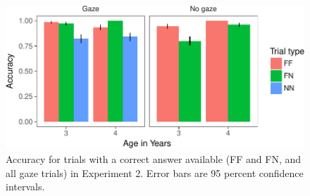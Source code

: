 \documentclass[a4paper,man,apacite,floatsintext]{apa6}
\newenvironment{CodeChunk}{}{}
\begin{document}
\begin{CodeChunk}
\begin{figure}[b]

{\centering \includegraphics{figs/acc_e2-1} 

}

\caption[Accuracy for trials with a correct answer available (FF and FN, and all gaze trials) in Experiment 2]{Accuracy for trials with a correct answer available (FF and FN, and all gaze trials) in Experiment 2. Error bars are 95 percent confidence intervals.}\label{fig:acc_e2}
\end{figure}
\end{CodeChunk}
\end{document}

